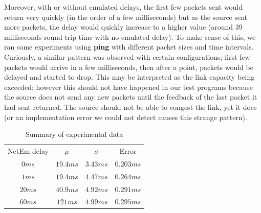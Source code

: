 \documentclass[conference]{IEEEtran}
\begin{document}
Moreover, with or without emulated delays, the first few packets sent would return
very quickly (in the order of a few milliseconds) but as the source sent more packets,
the delay would quickly increase to a higher value (around 39 milliseconds round trip time with no
emulated delay). To make sense of this, we ran some experiments using \textbf{ping}
with different packet sizes and time intervals. Curiously, a similar pattern was observed
with certain configurations; first few packets would arrive in a few milliseconds, then
after a point, packets would be delayed and started to drop. This may be interpreted
as the link capacity being exceeded; however this should not have happened in our test programs
because the source does not send any new packets until the feedback of the last packet it had sent
returned. The source should not be able to congest the link, yet it does
(or an implementation error we could not detect causes this strange pattern).

\begin{table}
    \centering
    \begin{tabular}{c c c c}
        \toprule
        NetEm delay & $\mu$ & $\sigma$ & Error \\
        $0ms$   &    $19.4ms$   &   $3.43ms$    &   $0.203ms$ \\
        $1ms$   &    $19.4ms$   &   $4.47ms$    &   $0.264ms$ \\
        $20ms$   &    $40.9ms$   &   $4.92ms$    &   $0.291ms$ \\
        $60ms$   &    $121ms$   &   $4.99ms$    &   $0.295ms$ \\
        \bottomrule
    \end{tabular}\label{table:data} \\
    \caption{Summary of experimental data}\label{table:data}
\end{table}
\end{document}
